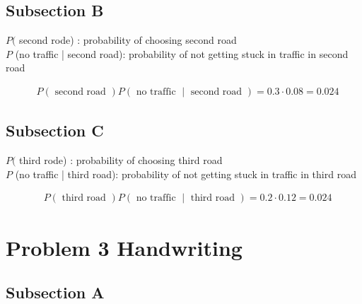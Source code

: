 \documentclass[a4paper,11pt]{article}
\theoremstyle{mytheor}
\begin{document}
\subsection{Subsection B}
$P($ second rode) : probability of choosing second road\\
$P$ (no traffic | second road): probability of not getting stuck in traffic in second road

\begin{align*}
& P(\text { second road }) P(\text { no traffic } \mid \text { second road })= 0.3 \cdot 0.08=0.024
\end{align*}

\subsection{Subsection C}
$P($ third rode) : probability of choosing third road\\
$P$ (no traffic | third road): probability of not getting stuck in traffic in third road

\begin{align*}
& P(\text { third road }) P(\text { no traffic } \mid \text { third road })= 0.2 \cdot 0.12=0.024
\end{align*}
\newpage
\section{Problem 3 Handwriting}
\subsection{Subsection A}
\end{document}
